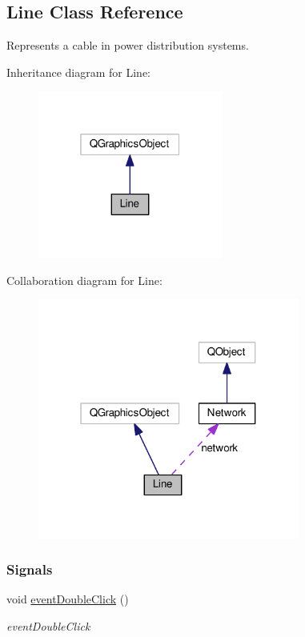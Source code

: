 \hypertarget{class_line}{}\subsection{Line Class Reference}
\label{class_line}


Represents a cable in power distribution systems.  




Inheritance diagram for Line\+:
\nopagebreak
\begin{figure}[H]
\begin{center}
\leavevmode
\includegraphics[width=172pt]{class_line__inherit__graph}
\end{center}
\end{figure}


Collaboration diagram for Line\+:
\nopagebreak
\begin{figure}[H]
\begin{center}
\leavevmode
\includegraphics[width=244pt]{class_line__coll__graph}
\end{center}
\end{figure}
\subsubsection*{Signals}
\begin{DoxyCompactItemize}
\item 
void \hyperlink{class_line_a2444b577ea2254994599c6f829c629a5}{event\+Double\+Click} ()
\begin{DoxyCompactList}\small\item\em event\+Double\+Click \end{DoxyCompactList}\end{DoxyCompactItemize}
